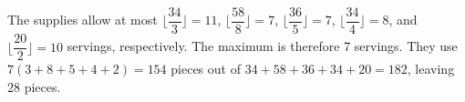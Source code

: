 The supplies allow at most $\lfloor\dfrac{34}{3}\rfloor=11$, $\lfloor\dfrac{58}{8}\rfloor=7$, $\lfloor\dfrac{36}{5}\rfloor=7$, $\lfloor\dfrac{34}{4}\rfloor=8$, and $\lfloor\dfrac{20}{2}\rfloor=10$ servings, respectively. The maximum is therefore 7 servings. They use $7(3+8+5+4+2)=154$ pieces out of $34+58+36+34+20=182$, leaving $\boxed{28}$ pieces.
